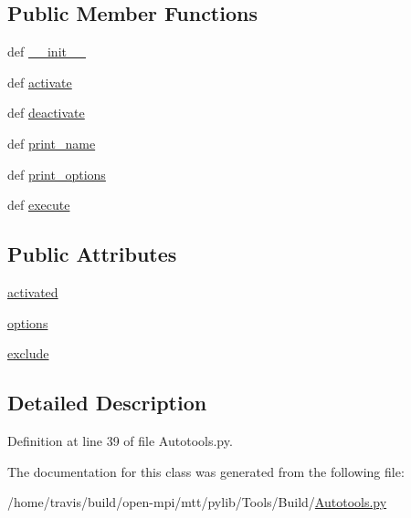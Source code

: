 \subsection*{Public Member Functions}
\begin{DoxyCompactItemize}
\item 
def \hyperlink{group___tools_ga5b5ac092ad7f4bc45bf785633c8be95a}{\-\_\-\-\_\-init\-\_\-\-\_\-}
\item 
def \hyperlink{group___tools_ga202b0e727db575d20a381cd039dd3597}{activate}
\item 
def \hyperlink{group___tools_ga74513a2f4135b506e66c047559f9571e}{deactivate}
\item 
def \hyperlink{group___tools_ga0873459245ef2255a5a7386957fa592e}{print\-\_\-name}
\item 
def \hyperlink{group___tools_ga41481e9f2a7e7fce32f51cc8feb909fd}{print\-\_\-options}
\item 
def \hyperlink{group___tools_ga5ae85e70e9e6252f4be23ef60624f633}{execute}
\end{DoxyCompactItemize}
\subsection*{Public Attributes}
\begin{DoxyCompactItemize}
\item 
\hyperlink{group___tools_ga6bbb714a91bc8b6fe749326772b073b3}{activated}
\item 
\hyperlink{group___tools_ga8b348e19f0a7104bde9c43c3a6ed695d}{options}
\item 
\hyperlink{group___tools_gaee37d9789ea22ee310ebc357cd721b7f}{exclude}
\end{DoxyCompactItemize}


\subsection{Detailed Description}


Definition at line 39 of file Autotools.\-py.



The documentation for this class was generated from the following file\-:\begin{DoxyCompactItemize}
\item 
/home/travis/build/open-\/mpi/mtt/pylib/\-Tools/\-Build/\hyperlink{_autotools_8py}{Autotools.\-py}\end{DoxyCompactItemize}
